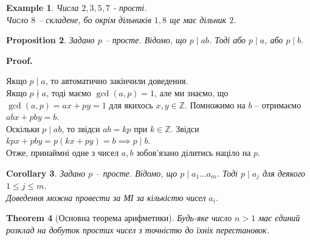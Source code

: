 \documentclass[a4paper, 14pt]{extarticle}
\makeatletter
\theoremstyle{theoremdd}
\newtheorem{theorem}{Theorem}[subsection]
\theoremstyle{theoremdd}
\theoremstyle{theoremdd}
\theoremstyle{theoremdd}
\newtheorem{example}[theorem]{Example}
\theoremstyle{theoremdd}
\newtheorem{proposition}[theorem]{Proposition}
\theoremstyle{theoremdd}
\theoremstyle{theoremdd}
\theoremstyle{theoremdd}
\newtheorem{corollary}[theorem]{Corollary}
\def\qed{$\blacksquare$}
\renewenvironment{proof}[1][Proof.\\]{\par
\pushQED{\hfill \qed}%
\normalfont \topsep6\p@\@plus6\p@\relax
\trivlist
\item\relax
{\bfseries
#1\@addpunct{.}}\hspace\labelsep\ignorespaces
}{%
\popQED\endtrivlist\@endpefalse
}
\makeatother
\begin{document}
\begin{example}
Числа $2,3,5,7$ - прості.\\
Число $8$ -- складене, бо окрім дільників $1,8$ ще має дільник $2$.
\end{example}

\begin{proposition}
Задано $p$ -- просте. Відомо, що $p \mid ab$. Тоді або $p \mid a$, або $p \mid b$.
\end{proposition}

\begin{proof}
Якщо $p \mid a$, то автоматично закінчили доведення.\\
Якщо $p \nmid a$, тоді маємо $\gcd(a,p) = 1$, але ми знаємо, що $\gcd (a,p) = ax+py = 1$ для якихось $x,y \in \mathbb{Z}$. Помножимо на $b$ -- отримаємо\\
$abx + pby = b$.\\
Оскільки $p \mid ab$, то звідси $ab = kp$ при $k \in \mathbb{Z}$. Звідси\\ $kpx + pby = p(kx+py) = b \implies p \mid b$.\\
Отже, принаймні одне з чисел $a,b$ зобов'язано ділитись націло на $p$.
\end{proof}

\begin{corollary}
Задано $p$ -- просте. Відомо, що $p \mid a_1 \dots a_m$. Тоді $p \mid a_j$ для деякого $1 \leq j \leq m$.\\
\textit{Доведення можна провести за МІ за кількістю чисел $a_i$.}
\end{corollary}

\begin{theorem}[Основна теорема арифметики]
Будь-яке число $n > 1$ має єдиний розклад на добуток простих чисел з точністю до їхніх перестановок.
\end{theorem}
\end{document}
